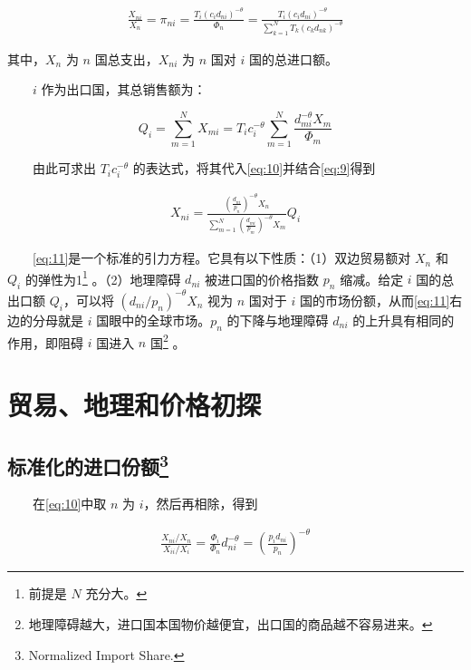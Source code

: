 \documentclass[]{article}
\let\rmarkdownfootnote\footnote%
\def\footnote{\protect\rmarkdownfootnote}
\begin{document}
\begin{align}
\frac{X_{n i}}{X_{n}}=\pi_{ni}=\frac{T_{i}\left(c_{i} d_{n i}\right)^{-\theta}}{\Phi_{n}}=\frac{T_{i}\left(c_{i} d_{n i}\right)^{-\theta}}{\sum_{k=1}^{N} T_{k}\left(c_{k} d_{n k}\right)^{-\theta}} \label{eq:10}
\end{align}

其中，\(X_{n}\) 为 \(n\) 国总支出，\(X_{n i}\) 为 \(n\) 国对 \(i\) 国的总进口额。

　　\(i\) 作为出口国，其总销售额为：

\[
Q_{i}=\sum_{m=1}^{N} X_{m i}=T_{i} c_{i}^{-\theta} \sum_{m=1}^{N} \frac{d_{m i}^{-\theta} X_{m}}{\Phi_{m}}
\]

　　由此可求出 \(T_{i} c_{i}^{-\theta}\) 的表达式，将其代入\eqref{eq:10}并结合\eqref{eq:9}得到

\begin{align}
X_{n i}=\frac{\left(\frac{d_{n i}}{p_{n}}\right)^{-\theta} X_{n}}{\sum_{m=1}^{N}\left(\frac{d_{m i}}{p_{m}}\right)^{-\theta} X_{m}} Q_{i} \label{eq:11}
\end{align}

　　\eqref{eq:11}是一个标准的{引力方程}。它具有以下性质：（1）双边贸易额对 \(X_n\) 和 \(Q_i\) 的弹性为1\footnote{前提是 \(N\) 充分大。} 。（2）地理障碍 \(d_{ni}\) 被进口国的价格指数 \(p_n\) 缩减。给定 \(i\) 国的总出口额 \(Q_i\)，可以将 \({\left({d_{n i}}/{p_{n}}\right)^{-\theta} X_{n}}\) 视为 \(n\) 国对于 \(i\) 国的市场份额，从而\eqref{eq:11}右边的分母就是 \(i\) 国眼中的全球市场。\(p_n\) 的下降与地理障碍 \(d_{ni}\) 的上升具有相同的作用，即阻碍 \(i\) 国进入 \(n\) 国\footnote{地理障碍越大，进口国本国物价越便宜，出口国的商品越不容易进来。} 。

\hypertarget{section-11}{%
\section{贸易、地理和价格初探}\label{section-11}}

\hypertarget{section-12}{%
\subsection[标准化的进口份额]{\texorpdfstring{标准化的进口份额\footnote{Normalized Import Share.}}{标准化的进口份额}}\label{section-12}}

　　在\eqref{eq:10}中取 \(n\) 为 \(i\)，然后再相除，得到

\begin{align}
\frac{X_{n i} / X_{n}}{X_{i i} / X_{i}}=\frac{\Phi_{i}}{\Phi_{n}} d_{n i}^{-\theta}=\left(\frac{p_{i} d_{n i}}{p_{n}}\right)^{-\theta} \label{eq:12}
\end{align}
\end{document}
